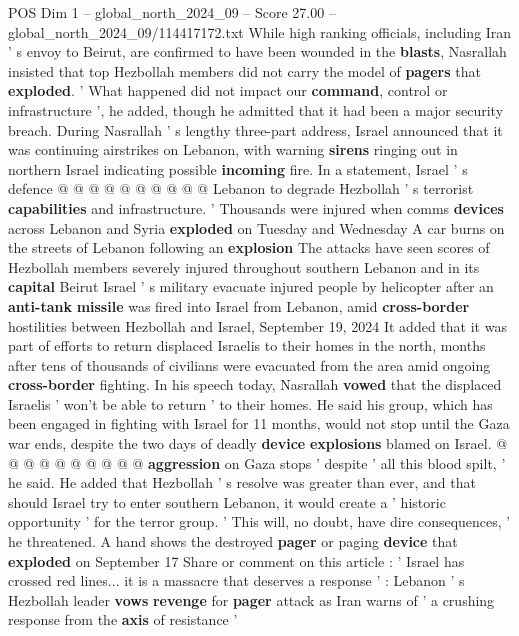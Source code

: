 \begin{textsample}{POS Dim 1 – global\_north\_2024\_09 – Score 27.00 – global\_north\_2024\_09/114417172.txt}
While high ranking officials, including Iran ' s envoy to Beirut, are confirmed to have been wounded in the \textbf{blasts}, Nasrallah insisted that top Hezbollah members did not carry the model of \textbf{pagers} that \textbf{exploded}. ' What happened did not impact our \textbf{command}, control or infrastructure ', he added, though he admitted that it had been a major security breach.
During Nasrallah ' s lengthy three-part address, Israel announced that it was continuing airstrikes on Lebanon, with warning \textbf{sirens} ringing out in northern Israel indicating possible \textbf{incoming} fire.
In a statement, Israel ' s defence @ @ @ @ @ @ @ @ @ @ Lebanon to degrade Hezbollah ' s terrorist \textbf{capabilities} and infrastructure. ' Thousands were injured when comms \textbf{devices} across Lebanon and Syria \textbf{exploded} on Tuesday and Wednesday A car burns on the streets of Lebanon following an \textbf{explosion} The attacks have seen scores of Hezbollah members severely injured throughout southern Lebanon and in its \textbf{capital} Beirut Israel ' s military evacuate injured people by helicopter after an \textbf{anti-tank} \textbf{missile} was fired into Israel from Lebanon, amid \textbf{cross-border} hostilities between Hezbollah and Israel, September 19, 2024 It added that it was part of efforts to return displaced Israelis to their homes in the north, months after tens of thousands of civilians were evacuated from the area amid ongoing \textbf{cross-border} fighting.
In his speech today, Nasrallah \textbf{vowed} that the displaced Israelis ' won't be able to return ' to their homes.
He said his group, which has been engaged in fighting with Israel for 11 months, would not stop until the Gaza war ends, despite the two days of deadly \textbf{device} \textbf{explosions} blamed on Israel. @ @ @ @ @ @ @ @ @ @ \textbf{aggression} on Gaza stops ' despite ' all this blood spilt, ' he said.
He added that Hezbollah ' s resolve was greater than ever, and that should Israel try to enter southern Lebanon, it would create a ' historic opportunity ' for the terror group. ' This will, no doubt, have dire consequences, ' he threatened.
A hand shows the destroyed \textbf{pager} or paging \textbf{device} that \textbf{exploded} on September 17 Share or comment on this article : ' Israel has crossed red lines... it is a massacre that deserves a response ' : Lebanon ' s Hezbollah leader \textbf{vows} \textbf{revenge} for \textbf{pager} attack as Iran warns of ' a crushing response from the \textbf{axis} of resistance '

\end{textsample}
